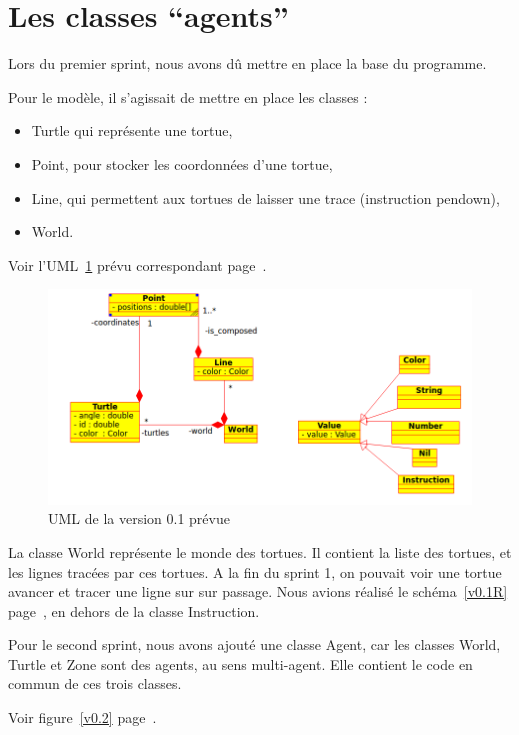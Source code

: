 \section{Les classes \enquote{agents}}
Lors du premier sprint, nous avons dû mettre en place la base du programme.

 Pour le modèle, il s'agissait de mettre en place les classes :
\begin{itemize}
\item Turtle qui représente une tortue, 
\item Point, pour stocker les coordonnées d'une tortue,
\item Line, qui permettent aux tortues de laisser une trace (instruction pendown),
\item World.
\end{itemize}


Voir l'UML~\ref{v0.1} prévu correspondant page~\pageref{v0.1}.\\


\begin{figure}[h]
\caption{\label{v0.1} UML de la version 0.1 prévue}
\includegraphics[scale=0.5]{doc/report/uml/v01.png}
\end{figure}


La classe World représente le monde des tortues. Il contient la liste des tortues, et les lignes tracées par ces tortues.
A la fin du sprint 1, on pouvait voir une tortue avancer et tracer une ligne sur sur passage.
Nous avions réalisé le schéma~\ref{v0.1R} page~\pageref{v0.1R}, en dehors de la classe Instruction.


Pour le second sprint, nous avons ajouté une classe Agent, car les classes World, Turtle et Zone sont des agents, au sens multi-agent. Elle contient le code en commun de ces trois classes.


 Voir figure~\ref{v0.2} page~\pageref{v0.2}.

